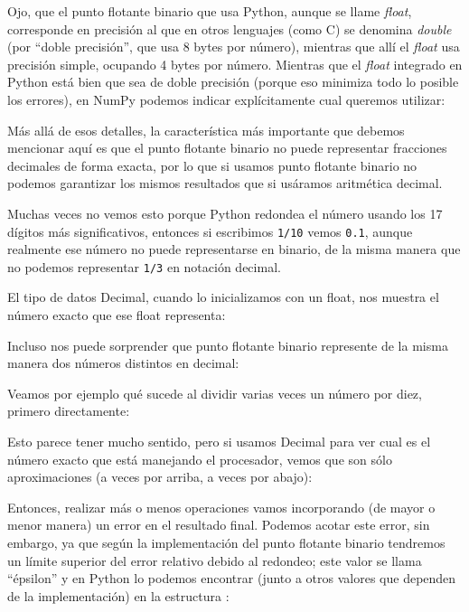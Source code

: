 Ojo, que el punto flotante binario que usa Python, aunque se llame \emph{float}, corresponde en precisión al que en otros lenguajes (como C) se denomina \emph{double} (por ``doble precisión'', que usa 8 bytes por número), mientras que allí el \emph{float} usa precisión simple, ocupando 4 bytes por número. Mientras que el \emph{float} integrado en Python está bien que sea de doble precisión (porque eso minimiza todo lo posible los errores), en NumPy podemos indicar explícitamente cual queremos utilizar:


Más allá de esos detalles, la característica más importante que debemos mencionar aquí es que el punto flotante binario no puede representar fracciones decimales de forma exacta, por lo que si usamos punto flotante binario no podemos garantizar los mismos resultados que si usáramos aritmética decimal. 

Muchas veces no vemos esto porque Python redondea el número usando los 17 dígitos más significativos, entonces si escribimos \verb|1/10| vemos \verb|0.1|, aunque realmente ese número no puede representarse en binario, de la misma manera que no podemos representar \verb|1/3| en notación decimal. 


El tipo de datos Decimal, cuando lo inicializamos con un float, nos muestra el número exacto que ese float representa:


Incluso nos puede sorprender que punto flotante binario represente de la misma manera dos números distintos en decimal:


Veamos por ejemplo qué sucede al dividir varias veces un número por diez, primero directamente:


Esto parece tener mucho sentido, pero si usamos Decimal para ver cual es el número exacto que está manejando el procesador, vemos que son sólo aproximaciones (a veces por arriba, a veces por abajo):


Entonces, realizar más o menos operaciones vamos incorporando (de mayor o menor manera) un error en el resultado final. Podemos acotar este error, sin embargo, ya que según la implementación del punto flotante binario tendremos un límite superior del error relativo debido al redondeo; este valor se llama ``épsilon'' y en Python lo podemos encontrar (junto a otros valores que dependen de la implementación) en la estructura :

